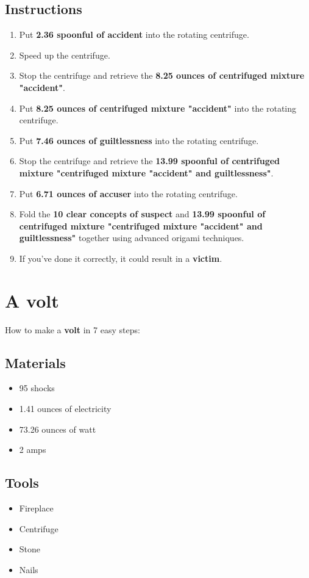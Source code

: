 \documentclass{article}
\begin{document}
\subsection{Instructions}\begin{enumerate}
\item 
Put \textbf{2.36 spoonful of accident} into the rotating centrifuge.
\item 
Speed up the centrifuge.
\item 
Stop the centrifuge and retrieve the \textbf{8.25 ounces of centrifuged mixture "accident"}.
\item 
Put \textbf{8.25 ounces of centrifuged mixture "accident"} into the rotating centrifuge.
\item 
Put \textbf{7.46 ounces of guiltlessness} into the rotating centrifuge.
\item 
Stop the centrifuge and retrieve the \textbf{13.99 spoonful of centrifuged mixture "centrifuged mixture "accident" and guiltlessness"}.
\item 
Put \textbf{6.71 ounces of accuser} into the rotating centrifuge.
\item 
Fold the \textbf{10 clear concepts of suspect} and \textbf{13.99 spoonful of centrifuged mixture "centrifuged mixture "accident" and guiltlessness"} together using advanced origami techniques.
\item 
If you've done it correctly, it could result in a \textbf{victim}.
\end{enumerate}
\newpage
\section{A volt}How to make a \textbf{volt} in 7 easy steps:

\subsection{Materials}\begin{itemize}
\item 
95 shocks
\item 
1.41 ounces of electricity
\item 
73.26 ounces of watt
\item 
2 amps
\end{itemize}
\subsection{Tools}\begin{itemize}
\item 
Fireplace
\item 
Centrifuge
\item 
Stone
\item 
Nails
\end{itemize}
\end{document}
